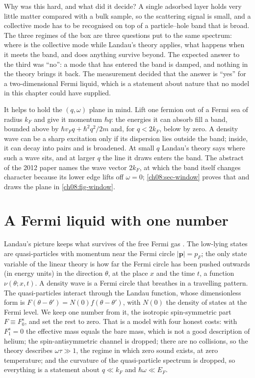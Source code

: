 Why was this hard, and what did it decide?
A single adsorbed layer holds very little matter compared with a bulk sample, so the scattering signal is small, and a collective mode has to be recognised on top of a particle--hole band that is broad.
The three regimes of the box are three questions put to the same spectrum: where is the collective mode while Landau's theory applies, what happens when it meets the band, and does anything survive beyond.
The expected answer to the third was ``no'': a mode that has entered the band is damped, and nothing in the theory brings it back.
The measurement decided that the answer is ``yes'' for a two-dimensional Fermi liquid, which is a statement about nature that no model in this chapter could have supplied.

It helps to hold the $(q,\omega)$ plane in mind.
Lift one fermion out of a Fermi sea of radius $k_F$ and give it momentum $\hbar q$: the energies it can absorb fill a band, bounded above by $\hbar v_Fq+\hbar^2q^2/2m$ and, for $q<2k_F$, below by zero.
A density wave can be a sharp excitation only if its dispersion lies outside the band; inside, it can decay into pairs and is broadened.
At small $q$ Landau's theory says where such a wave sits, and at larger $q$ the line it draws enters the band.
The abstract of the 2012 paper names the wave vector $2k_F$, at which the band itself changes character because its lower edge lifts off $\omega=0$; \cref{ch08:sec-window} proves that and draws the plane in \cref{ch08:fig-window}.

\section{A Fermi liquid with one number}\label{ch08:sec-model}

Landau's picture keeps what survives of the free Fermi gas \cite{Landau1957,BaymPethick1991}.
The low-lying states are quasi-particles with momentum near the Fermi circle $|\mathbf p|=p_F$; the only state variable of the linear theory is how far the Fermi circle has been pushed outwards (in energy units) in the direction $\theta$, at the place $x$ and the time $t$, a function $\nu(\theta;x,t)$.
A density wave is a Fermi circle that breathes in a travelling pattern.
The quasi-particles interact through the Landau function, whose dimensionless form is $F(\theta-\theta')=N(0)f(\theta-\theta')$, with $N(0)$ the density of states at the Fermi level.
We keep one number from it, the isotropic spin-symmetric part $F\equiv F_0^s$, and set the rest to zero.
That is a model with four honest costs: with $F_1^s=0$ the effective mass equals the bare mass, which is not a good description of helium; the spin-antisymmetric channel is dropped; there are no collisions, so the theory describes $\omega\tau\gg1$, the regime in which zero sound exists, at zero temperature; and the curvature of the quasi-particle spectrum is dropped, so everything is a statement about $q\ll k_F$ and $\hbar\omega\ll E_F$.

